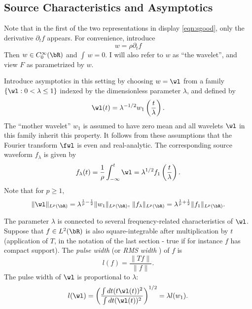 \subsection{Source Characteristics and Asymptotics}

Note that in the first of the two representations in display \ref{eqn:sgood}, only the
derivative $\partial_tf$ appears. For convenience, introduce
\begin{equation}
  \label{eqn:wavelet}
  w = \rho \partial_t f
\end{equation}
Then  $w \in C^{\infty}_0(\bR)$ and $\int \, w = 0$. I will also
refer to $w$ as ``the wavelet'', and view $F$ as parametrized by $w$.

Introduce asymptotics in this setting by choosing $w = \wl$
from a family $\{\wl:0 <\lambda \le 1\}$ indexed by the dimensionless parameter
$\lambda$, and defined by
\begin{equation}
  \label{eqn:wfam}
  \wl(t) = \lambda^{-1/2}w_1\left(\frac{t}{\lambda}\right).
\end{equation}
The  ``mother wavelet'' $w_1$ is assumed to have zero mean and
all wavelets $\wl$ in this family
inherit this property.
It follows from these assumptions that the Fourier transform $\fwl$ is
even and real-analytic. The corresponding source waveform $f_{\lambda}$ is
given by
\begin{equation}
  \label{eqn:flambda}
  f_{\lambda}(t) =\frac{1}{\rho} \int_{-\infty}^t\wl =
  \lambda^{1/2}f_1\left(\frac{t}{\lambda}\right).
\end{equation}
Note that for $p \ge 1$,
\begin{equation}
  \label{eqn:lambdanorms}
  \|\wl\|_{L^p(\bR)} = \lambda ^{\frac{1}{p}-\frac{1}{2}}\|w_1\|_{L^p(\bR)},\,\|f_{\lambda}\|_{L^p(\bR)}
  = \lambda ^{\frac{1}{p}+\frac{1}{2}} \|f_1\|_{L^p(\bR)}.
\end{equation}


The parameter $\lambda$ is connected to several frequency-related
characteristics of $\wl$. Suppose that $f \in L^2(\bR)$ is also square-integrable after
multiplication by $t$ (application of $T$, in the notation of the last
section - true if for instance $f$ has compact
support). The {\em pulse width} (or {\em RMS width} ) of $f$ is
\begin{equation}
  \label{eqn:pw}
  l(f) = \frac{\|Tf\|}{\|f\|}.
\end{equation}
The pulse width of $\wl$ is proportional to $\lambda$:
\begin{equation}
  \label{eqn:wpw}
  l(\wl) = \left(\frac{\int dt (t \wl(t))^2}{\int dt (\wl(t))^2}
  \right)^{1/2} = \lambda l(w_1).
\end{equation}


